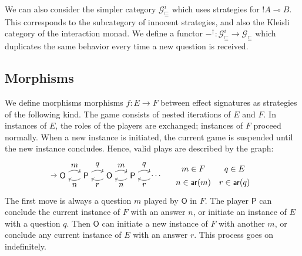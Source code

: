 \documentclass[format=sigplan,authordraft]{acmart}
\newcommand{\gcat}{\mathcal{G}_{\sqsubseteq}}
\newcommand{\kw}[1]{\ensuremath{ \mathsf{#1} }}
\begin{document}
We can also consider the simpler category
$\gcat^i$
which uses strategies for ${!A} \multimap B$.
This corresponds to the subcategory of innocent strategies,
and also the Kleisli category of the interaction monad.
We define a functor
$-^\dagger : \gcat^i \rightarrow \gcat$
which duplicates the same behavior
every time a new question is received.

\subsection{Morphisms} %
\label{sec:arrow}

We define morphisms morphisms $f : E \rightarrow F$
between effect signatures
as strategies of the following kind.
The game consists of nested iterations of $E$ and $F$.
In instances of $E$, the roles of the players are exchanged;
instances of $F$ proceed normally.
When a new instance is initiated,
the current game is suspended
until the new instance concludes.
Hence, valid plays
are described by the graph:
\[
  \begin{tikzpicture}[baseline=(O1.base)]
    \node (O1) at (0,0) {\kw{O}};
    \node (P1) at (1,0) {\kw{P}};
    \node (O2) at (2,0) {\kw{O}};
    \node (P2) at (3,0) {\kw{P}};
    \node (O3) at (4,0) {$\ldots$};
    \path [->] (-0.5,0) edge (O1);
    \path [->] (O1) edge[bend left] node[auto] {$m$} (P1);
    \path [->] (P1) edge[bend left] node[auto] {$n$} (O1);
    \path [->] (P1) edge[bend left] node[auto] {$q$} (O2);
    \path [->] (O2) edge[bend left] node[auto] {$r$} (P1);
    \path [->] (O2) edge[bend left] node[auto] {$m$} (P2);
    \path [->] (P2) edge[bend left] node[auto] {$n$} (O2);
    \path [->] (P2) edge[bend left] node[auto] {$q$} (O3);
    \path [->] (O3) edge[bend left] node[auto] {$r$} (P2);
  \end{tikzpicture}
  \quad
  \begin{array}{cc}
    m \in F & q \in E \\[1ex]
    n \in \kw{ar}(m) & r \in \kw{ar}(q)
  \end{array}
\]
The first move is always a question $m$ played by $\kw{O}$ in $F$.
The player $\kw{P}$ can conclude the current instance of $F$
with an answer $n$, or
initiate an instance of $E$
with a question $q$.
Then $\kw{O}$ can initiate a new instance of $F$
with another $m$, or
conclude any current instance of $E$
with an answer $r$.
This process goes on indefinitely.
\end{document}
